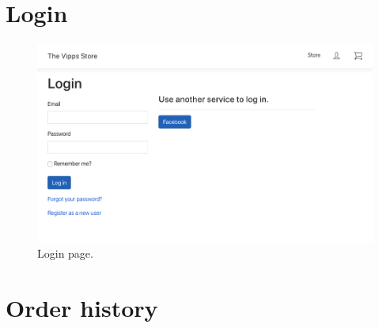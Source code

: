 \documentclass[11pt,a4paper,english]{article}
\begin{document}
\section*{Login}
\begin{figure}[htbp]
  \centering
  \includegraphics[scale=0.3]{login}
  \caption{Login page.}
  \label{fig:login}
\end{figure}
\section*{Order history}
\end{document}
